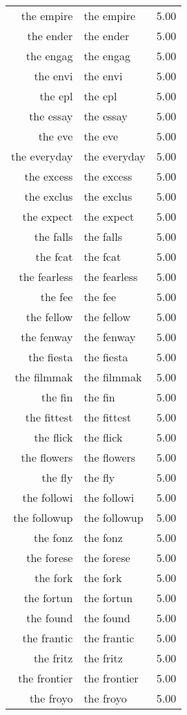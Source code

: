\begin{table}[ht]
\begin{tabular}{rlr}
  the empire & the empire & 5.00 \\ 
  the ender & the ender & 5.00 \\ 
  the engag & the engag & 5.00 \\ 
  the envi & the envi & 5.00 \\ 
  the epl & the epl & 5.00 \\ 
  the essay & the essay & 5.00 \\ 
  the eve & the eve & 5.00 \\ 
  the everyday & the everyday & 5.00 \\ 
  the excess & the excess & 5.00 \\ 
  the exclus & the exclus & 5.00 \\ 
  the expect & the expect & 5.00 \\ 
  the falls & the falls & 5.00 \\ 
  the fcat & the fcat & 5.00 \\ 
  the fearless & the fearless & 5.00 \\ 
  the fee & the fee & 5.00 \\ 
  the fellow & the fellow & 5.00 \\ 
  the fenway & the fenway & 5.00 \\ 
  the fiesta & the fiesta & 5.00 \\ 
  the filmmak & the filmmak & 5.00 \\ 
  the fin & the fin & 5.00 \\ 
  the fittest & the fittest & 5.00 \\ 
  the flick & the flick & 5.00 \\ 
  the flowers & the flowers & 5.00 \\ 
  the fly & the fly & 5.00 \\ 
  the followi & the followi & 5.00 \\ 
  the followup & the followup & 5.00 \\ 
  the fonz & the fonz & 5.00 \\ 
  the forese & the forese & 5.00 \\ 
  the fork & the fork & 5.00 \\ 
  the fortun & the fortun & 5.00 \\ 
  the found & the found & 5.00 \\ 
  the frantic & the frantic & 5.00 \\ 
  the fritz & the fritz & 5.00 \\ 
  the frontier & the frontier & 5.00 \\ 
  the froyo & the froyo & 5.00 \\ 

\end{tabular}
\end{table}
